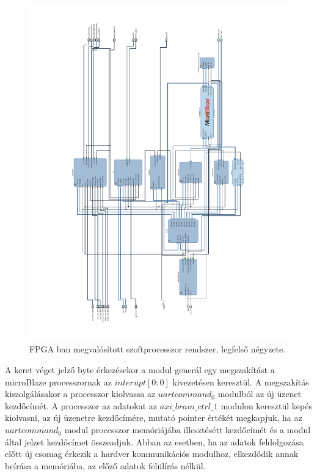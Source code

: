 \renewcommand{\img}{SajatRobot/FPGAmodulok/UartUML.jpg}
\renewcommand{\sources}{*}
\renewcommand{\captionn}{FPGA hardver/MicroBlaze processzor és ROS node közti kommunikáció megvalósítása UART protokoll alapján }
\renewcommand{\figlabel}{FPGAuartRos}


\begin{figure}[H]
  \includegraphics[width=1.2\columnwidth]{tikz/VivadoHL.pdf}
  \caption{FPGA ban megvalósított szoftprocesszor rendszer, legfelső négyzete.}
  \label{fig:VivadoHl}
\end{figure}

A keret véget jelző byte érkezésekor a modul generál egy megszakítást a microBlaze processzornak az $interupt[0:0]$ kivezetésen keresztül.
A megszakítás kiszolgálásakor a processzor kiolvassa az $uartcommand_0$ modulból az új üzenet kezdőcímét. A processzor az adatokat az $axi\_bram\_ctrl\_1$ modulon keresztül kepés kiolvasni, az új üzenetre kezdőcímére, mutató pointer értékét megkapjuk, ha az $uartcommand_0$ modul processzor memóriájába illesztésétt kezdőcímét és a modul által jelzet kezdőcímet összeadjuk.
Abban az esetben, ha az adatok feldolgozása előtt új csomag érkezik a hardver kommunikációs modulhoz, elkezdődik annak beírása a memóriába, az előző adatok felülírás nélkül.

